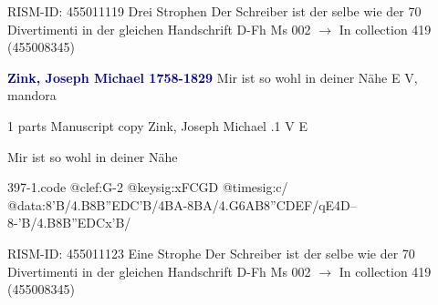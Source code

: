 \documentclass[twocolumn]{book}
\begin{document}
\newline RISM-ID: 455011119
\newline Drei Strophen
\newline Der Schreiber ist der selbe wie der 70 Divertimenti in der gleichen Handschrift
\newline D-Fh  Ms 002
\newline $\rightarrow$ In collection 419 (455008345)

\newline \par \vspace{7pt} \textcolor{darkblue}{\textbf{Zink, Joseph Michael  1758-1829}}
\newline Mir ist so wohl in deiner Nähe  E  
\newline V, mandora
\newline \begin{itshape}\end{itshape} 
\newline \textcolor{darkblue}{}  1 parts  
\newline Manuscript copy
\newline Zink, Joseph Michael
.1  V  E
\newline \begin{footnotesize} Mir ist so wohl in deiner Nähe \end{footnotesize}  
\begin{filecontents*}{397-1.code}
@clef:G-2
@keysig:xFCGD
@timesig:c/
@data:8'B/4.B8B''EDC'B/4BA-{8BA}/4.G{6AB}8''CDEF/qE4D--8-'B/4.B8B''EDCx'B/
\end{filecontents*}
\newline
%

\newline RISM-ID: 455011123
\newline Eine Strophe
\newline Der Schreiber ist der selbe wie der 70 Divertimenti in der gleichen Handschrift
\newline D-Fh  Ms 002
\newline $\rightarrow$ In collection 419 (455008345)
\end{document}
